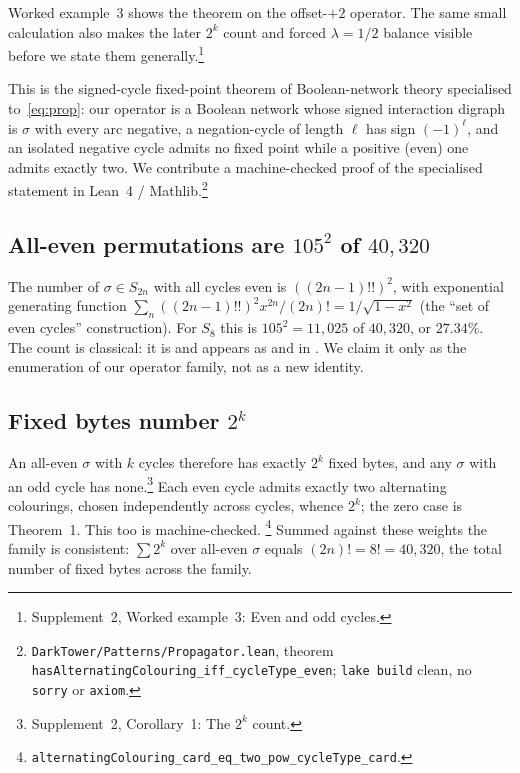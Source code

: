 \documentclass[man,12pt,floatsintext,donotrepeattitle]{apa7}
\newcommand{\sig}{\sigma}
\newcommand{\supptheorytext}[2]{Supplement~2, #1: #2.}
\newcommand{\supptheory}[2]{\footnote{\supptheorytext{#1}{#2}}}
\begin{document}
Worked example~3 shows the theorem on the offset-$+2$ operator. The
same small calculation also makes the later $2^k$ count and forced
$\lambda=1/2$ balance visible before we state them generally.\supptheory{Worked example~3}{Even and odd cycles}

This is the signed-cycle fixed-point theorem of Boolean-network theory
\parencite{aracena2008maximum} specialised to~\eqref{eq:prop}: our operator
is a Boolean network whose signed interaction digraph is $\sig$ with every
arc negative, a negation-cycle of length $\ell$ has sign $(-1)^\ell$, and
an isolated negative cycle admits no fixed point while a positive (even)
one admits exactly two. We contribute a machine-checked proof of the
specialised statement in Lean~4 / Mathlib.\footnote{%
\texttt{DarkTower/Patterns/Propagator.lean}, theorem
\texttt{hasAlternatingColouring\_iff\_cycleType\_even}; \texttt{lake build}
clean, no \texttt{sorry} or \texttt{axiom}.}

\subsection{All-even permutations are $105^2$ of $40{,}320$}

The number of $\sig \in S_{2n}$ with all cycles even is $((2n-1)!!)^2$, with
exponential generating function $\sum_n ((2n-1)!!)^2 x^{2n}/(2n)! =
1/\sqrt{1-x^2}$ (the ``set of even cycles'' construction).
For $S_8$ this is $105^2 = 11{,}025$ of $40{,}320$, or $27.34\%$. The count
is classical: it is \textcite{oeis_a001818} and appears as
\textcite[Problem~5.34(c)]{stanley1999enumerative} and in
\textcite{riordan1968combinatorial}. We claim it only as the enumeration of
our operator family, not as a new identity.

\subsection{Fixed bytes number \texorpdfstring{$2^k$}{2 to the k}}

An all-even $\sig$ with $k$ cycles therefore has exactly $2^k$ fixed bytes, and any
$\sig$ with an odd cycle has none.\supptheory{Corollary~1}{The $2^k$ count}
Each even cycle admits exactly two alternating colourings, chosen independently
across cycles, whence $2^k$; the zero case is Theorem~1. This too
is machine-checked.%
\footnote{\texttt{alternatingColouring\_card\_eq\_two\_pow\_cycleType\_card}.}
Summed against these weights the family is consistent:
$\sum 2^{k}$ over all-even $\sig$ equals $(2n)! = 8! = 40{,}320$, the total
number of fixed bytes across the family.
\end{document}
